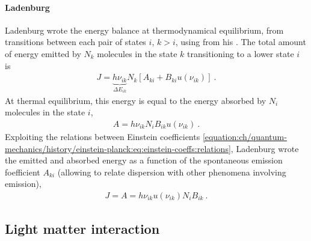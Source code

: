 \documentclass[letterpaper,10pt,english]{jupyterBook}
\begin{document}
\paragraph{Ladenburg}
\label{\detokenize{ch/quantum-mechanics/history/light-dispersion:ladenburg}}
\sphinxAtStartPar
Ladenburg wrote the energy balance at thermodynamical equilibrium, from transitions between each pair of states \(i\), \(k > i\), using  from his {\hyperref[\detokenize{ch/quantum-mechanics/history/einstein-planck:quantum-mehcanics-history-light-matter-einstein}]{}}.
The total amount of energy emitted by \(N_k\) molecules in the state \(k\) transitioning to a lower state \(i\) is
\begin{equation*}
\begin{split}J = \underbrace{h \nu_{ik}}_{\Delta E_{ik}} N_k \left[ A_{ki} + B_{ki} u(\nu_{ik}) \right] \ .\end{split}
\end{equation*}
\sphinxAtStartPar
At thermal equilibrium, this energy is equal to the energy absorbed by \(N_i\) molecules in the state \(i\),
\begin{equation*}
\begin{split}A = h \nu_{ik} N_i B_{ik} u(\nu_{ik}) \ .\end{split}
\end{equation*}
\sphinxAtStartPar
Exploiting the relations between Einstein coefficients \eqref{equation:ch/quantum-mechanics/history/einstein-planck:eq:einstein-coeffs:relations}, Ladenburg wrote the emitted and absorbed energy as a function of the spontaneous emission foefficient \(A_{ki}\) (allowing to relate dispersion with other phenomena involving emission),
\begin{equation*}
\begin{split}J = A = h \nu_{ik} u(\nu_{ik}) N_i B_{ik} \ . \end{split}
\end{equation*}
\sphinxstepscope


\subsection{Light matter interaction}
\label{\detokenize{ch/quantum-mechanics/history/einstein-planck:light-matter-interaction}}\label{\detokenize{ch/quantum-mechanics/history/einstein-planck:quantum-mehcanics-history-light-matter}}\label{\detokenize{ch/quantum-mechanics/history/einstein-planck::doc}}
\end{document}
